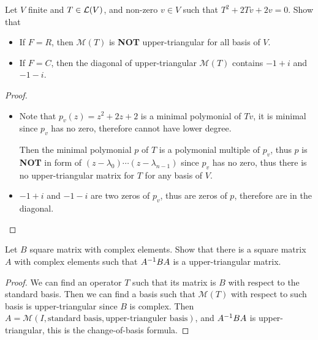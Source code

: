 \documentclass[../main.tex]{subfiles}
\begin{document}
\begin{exercise}
  Let $V$ finite and $T \in \mathcal{L}(V)$, and non-zero $v \in V$ such that $T^2 + 2Tv + 2v = 0$.
  Show that
  \begin{itemize}
    \item If $F = R$, then $\mathcal{M}(T)$ is \textbf{NOT} upper-triangular for all basis of $V$.
    \item If $F = C$, then the diagonal of upper-triangular $\mathcal{M}(T)$ contains $-1 + i$ and $-1 - i$.
  \end{itemize}
\end{exercise}
\begin{proof}
  ~
  \begin{itemize}
    \item Note that $p_v(z) = z^2 + 2z + 2$ is a minimal polymonial of $Tv$,
          it is minimal since $p_v$ has no zero, therefore cannot have lower degree.

          Then the minimal polymonial $p$ of $T$ is a polymonial multiple of $p_v$,
          thus $p$ is \textbf{NOT} in form of $(z - \lambda_0) \cdots (z - \lambda_{n - 1})$
          since $p_v$ has no zero, thus there is no upper-triangular matrix for $T$ for any basis of $V$.
    \item $- 1 + i$ and $- 1 - i$ are two zeros of $p_v$, thus are zeros of $p$, therefore are
          in the diagonal.
  \end{itemize}
\end{proof}

\begin{exercise}
  Let $B$ square matrix with complex elements. Show that there is a square matrix $A$
  with complex elements such that $A^{-1}BA$ is a upper-triangular matrix.
\end{exercise}
\begin{proof}
  We can find an operator $T$ such that its matrix is $B$ with respect to the standard basis.
  Then we can find a basis such that $\mathcal{M}(T)$ with respect to such basis is upper-triangular
  since $B$ is complex.
  Then \\ $A = \mathcal{M}(I, \text{standard basis}, \text{upper-trianguler basis})$,
  and $A^{-1}BA$ is upper-triangular, this is the change-of-basis formula.
\end{proof}
\end{document}
